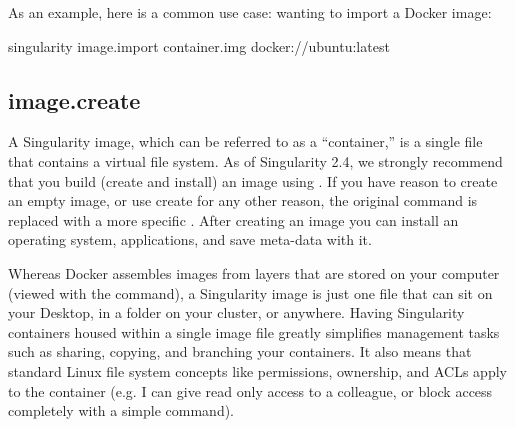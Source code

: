 \documentclass[letterpaper,10pt,english]{sphinxmanual}
\begin{document}
As an example, here is a common use case: wanting to import a Docker
image:

%
\begin{sphinxVerbatim}[commandchars=\\\{\}]
singularity image.import container.img docker://ubuntu:latest
\end{sphinxVerbatim}


\subsection{image.create}
\label{\detokenize{appendix:image-create}}\label{\detokenize{appendix:id41}}\label{\detokenize{appendix:sec-imagecreate}}
A Singularity image, which can be referred to as a “container,” is a
single file that contains a virtual file system. As of Singularity
2.4, we strongly recommend that you build (create and install) an
image using {\hyperref[\detokenize{build_a_container:build-a-container}]{}}. If you have reason to create an empty image, or use
create for any other reason, the original  command is replaced with a
more specific . After creating an image you can install an operating
system, applications, and save meta-data with it.

Whereas Docker assembles images from layers that are stored on your
computer (viewed with the  command), a Singularity image is just one
file that can sit on your Desktop, in a folder on your cluster, or
anywhere. Having Singularity containers housed within a single image
file greatly simplifies management tasks such as sharing, copying, and
branching your containers. It also means that standard Linux file
system concepts like permissions, ownership, and ACLs apply to the
container (e.g. I can give read only access to a colleague, or block
access completely with a simple  command).
\end{document}
